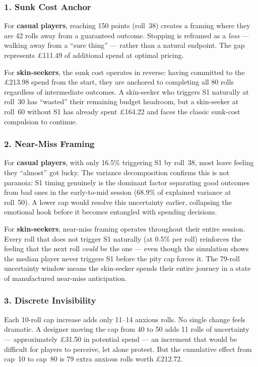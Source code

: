 \documentclass[11pt, a4paper]{article}
\begin{document}
\subsubsection*{1. Sunk Cost Anchor}

For \textbf{casual players}, reaching 150 points (roll~38) creates
a framing where they are 42 rolls away from a guaranteed outcome.
Stopping is reframed as a \emph{loss} --- walking away from a
``sure thing'' --- rather than a natural endpoint. The gap
represents \pounds111.49 of additional spend at optimal pricing.

For \textbf{skin-seekers}, the sunk cost operates in reverse:
having committed to the \pounds213.98 spend from the start, they are
anchored to completing all 80 rolls regardless of intermediate
outcomes. A skin-seeker who triggers S1 naturally at roll~30 has
``wasted'' their remaining budget headroom, but a skin-seeker at
roll~60 without S1 has already spent \pounds164.22 and faces the
classic sunk-cost compulsion to continue.

\subsubsection*{2. Near-Miss Framing}

For \textbf{casual players}, with only 16.5\% triggering S1 by
roll~38, most leave feeling they ``almost'' got lucky. The variance
decomposition confirms this is not paranoia: S1 timing genuinely is
the dominant factor separating good outcomes from bad ones in the
early-to-mid session (68.9\% of explained variance at roll~50). A
lower cap would resolve this uncertainty earlier, collapsing the
emotional hook before it becomes entangled with spending decisions.

For \textbf{skin-seekers}, near-miss framing operates throughout
their entire session. Every roll that does not trigger S1 naturally
(at 0.5\% per roll) reinforces the feeling that the next roll
\emph{could} be the one --- even though the simulation shows the
median player never triggers S1 before the pity cap forces it.
The 79-roll uncertainty window means the skin-seeker spends their
entire journey in a state of manufactured near-miss anticipation.

\subsubsection*{3. Discrete Invisibility}

Each 10-roll cap increase adds only 11--14 anxious rolls. No single
change feels dramatic. A designer moving the cap from 40 to 50 adds
11 rolls of uncertainty --- approximately \pounds31.50 in potential
spend --- an increment that would be difficult for players to
perceive, let alone protest. But the cumulative effect from cap~10
to cap~80 is 79 extra anxious rolls worth \pounds212.72.
\end{document}

